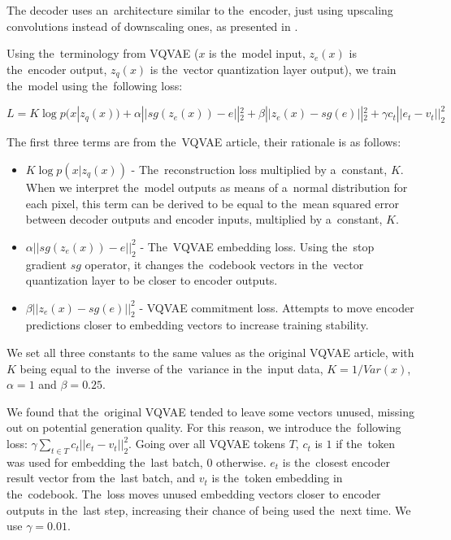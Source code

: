 The decoder uses an~architecture similar to the~encoder, just using upscaling convolutions instead of downscaling ones, as presented in .



Using the~terminology from VQVAE ($x$ is the~model input, $z_e(x)$ is the~encoder output, $z_q(x)$ is the~vector quantization layer output), we train the~model using the~following loss:

$$L = K\log p(x|z_q(x)) + \alpha ||sg(z_e(x)) - e||_2^2 + \beta ||z_e(x) - sg(e)||_2^2 + \gamma c_t ||e_t - v_t||_2^2$$

The first three terms are from the~VQVAE article, their rationale is as follows:

\begin{itemize}
\item $K\log p(x|z_q(x))$ - The~reconstruction loss multiplied by a~constant, $K$. When we interpret the~model outputs as means of a~normal distribution for each pixel, this term can be derived to be equal to the~mean squared error between decoder outputs and encoder inputs, multiplied by a~constant, $K$.
\item $\alpha ||sg(z_e(x)) - e||_2^2$ - The~VQVAE embedding loss. Using the~stop gradient $sg$ operator, it changes the~codebook vectors in the~vector quantization layer to be closer to encoder outputs.
\item $\beta ||z_e(x) - sg(e)||_2^2$ - VQVAE commitment loss. Attempts to move encoder predictions closer to embedding vectors to increase training stability.
\end{itemize}

We set all three constants to the same values as the original VQVAE article, with $K$ being equal to the~inverse of the~variance in the~input data, $K=1/Var(x)$, $\alpha=1$ and $\beta=0.25$.

We found that the~original VQVAE tended to leave some vectors unused, missing out on potential generation quality. For this reason, we introduce the~following loss: $\gamma \sum_{t \in T} c_t ||e_t - v_t||_2^2$. Going over all VQVAE tokens $T$, $c_t$ is $1$ if the~token was used for embedding the~last batch, $0$ otherwise. $e_t$ is the~closest encoder result vector from the~last batch, and $v_t$ is the~token embedding in the~codebook. The~loss moves unused embedding vectors closer to encoder outputs in the~last step, increasing their chance of being used the~next time. We use $\gamma=0.01$.

